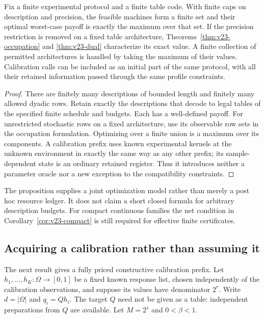 \begin{proposition}
\label{prop:v23-resource-order}
Fix a finite experimental protocol and a finite table code. With finite
caps on description and precision, the feasible machines form a finite
set and their optimal worst-case payoff is exactly the maximum over
that set. If the precision restriction is removed on a fixed table
architecture, Theorems~\ref{thm:v23-occupation} and
\ref{thm:v23-dual} characterize its exact value. A finite collection
of permitted architectures is handled by taking the maximum of their
values. Calibration calls can be included as an initial part of the
same protocol, with all their retained information passed through the
same profile constraints.
\end{proposition}
\begin{proof}
There are finitely many descriptions of bounded length and finitely
many allowed dyadic rows. Retain exactly the descriptions that decode
to legal tables of the specified finite schedule and budgets. Each
has a well-defined payoff. For unrestricted stochastic rows on a fixed
architecture, use its observable row sets in the occupation formulation.
Optimizing over a finite union is a maximum over its components. A
calibration prefix uses known experimental kernels at the unknown
environment in exactly the same way as any other prefix; its
sample-dependent state is an ordinary retained register. Thus it
introduces neither a parameter oracle nor a new exception to the
compatibility constraints.
\end{proof}

The proposition supplies a joint optimization model rather than merely
a post hoc resource ledger. It does not claim a short closed formula
for arbitrary description budgets. For compact continuous families the
net condition in Corollary~\ref{cor:v23-compact} is still required for
effective finite certificates.

\subsection{Acquiring a calibration rather than assuming it}
The next result gives a fully priced constructive calibration prefix.
Let $h_1,\ldots,h_K:\Omega\to[0,1]$ be a fixed known response list,
chosen independently of the calibration observations, and suppose its
values have denominator $2^r$. Write $d=|\Omega|$ and
$q_i=Qh_i$. The target $Q$ need not be given as a table: independent
preparations from $Q$ are available. Let $M=2^s$ and $0<\beta<1$.

